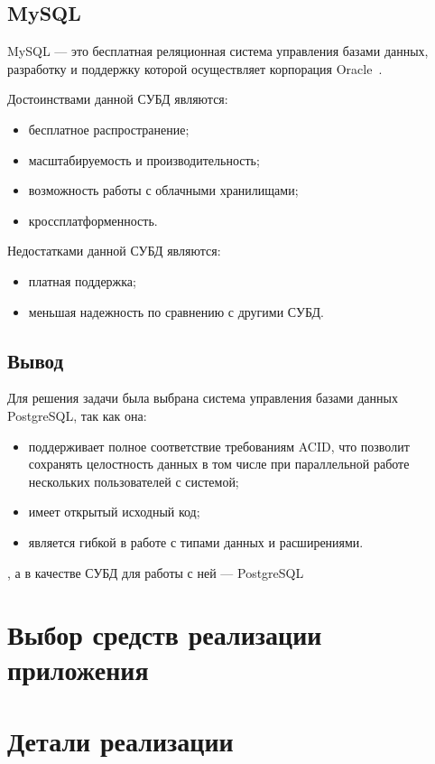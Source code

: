 \subsection{MySQL}

MySQL --- это бесплатная реляционная система управления базами данных,
разработку и поддержку которой осуществляет корпорация Oracle~\cite{art06}.

Достоинствами данной СУБД являются:
\begin{itemize}
    \item бесплатное распространение;
    \item масштабируемость и производительность;
    \item возможность работы с облачными хранилищами;
    \item кроссплатформенность.
\end{itemize}

Недостатками данной СУБД являются:
\begin{itemize}
    \item платная поддержка;
    \item меньшая надежность по сравнению с другими СУБД.
\end{itemize}

\subsection*{Вывод}

Для решения задачи была выбрана система управления базами данных
PostgreSQL, так как она:

\begin{itemize}
    \item поддерживает полное соответствие требованиям ACID, что
позволит сохранять целостность данных в том числе при параллельной работе
нескольких пользователей с системой;
    \item имеет открытый исходный код;
    \item является гибкой в работе с типами данных и расширениями.
\end{itemize}

, а в качестве СУБД для работы с ней --- PostgreSQL

\section{Выбор средств реализации приложения}

\section{Детали реализации}

